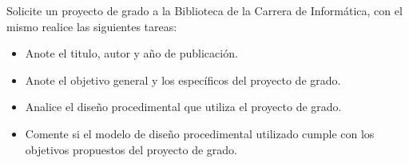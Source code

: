 Solicite un proyecto de grado a la Biblioteca de la Carrera de Informática, con el mismo realice las siguientes tareas:
\begin{itemize}
\item Anote el titulo, autor y año de publicación.
\item Anote el objetivo general y los específicos del proyecto de grado.
\item Analice el diseño procedimental que utiliza el proyecto de grado.
\item Comente si el modelo de diseño procedimental utilizado cumple con los objetivos propuestos del proyecto de grado.
\end{itemize}
